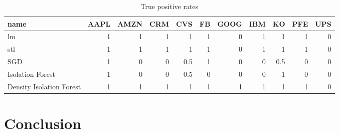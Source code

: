 \documentclass{article}
\begin{document}
\begin{table}
    \caption{True positive rates}
    \label{tab:tp_rates}
    \centering
    \small
    \begin{tabular}{l|r|r|r|r|r|r|r|r|r|r}
        \hline
        name & AAPL & AMZN & CRM & CVS & FB & GOOG & IBM & KO & PFE & UPS\\
        \hline
        lm & 1 & 1 & 1 & 1 & 1 & 0 & 1 & 1 & 1 & 0\\
        \hline
        stl & 1 & 1 & 1 & 1 & 1 & 0 & 1 & 1 & 1 & 0\\
        \hline
        SGD & 1 & 0 & 0 & 0.5 & 1 & 0 & 0 & 0.5 & 0 & 0\\
        \hline
        Isolation Forest & 1 & 0 & 0 & 0.5 & 0 & 0 & 0 & 1 & 0 & 0\\
        \hline
        Density Isolation Forest & 1 & 1 & 1 & 1 & 1 & 1 & 1 & 1 & 1 & 0\\
        \hline
    \end{tabular}
\end{table}

\section{Conclusion}
\end{document}
